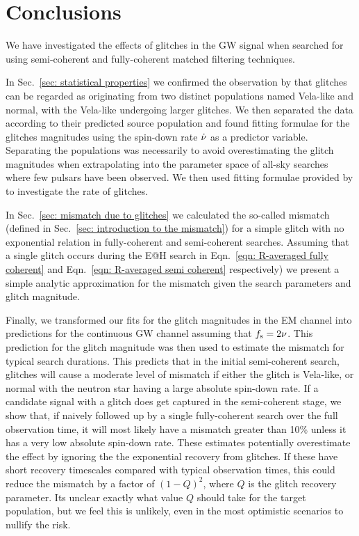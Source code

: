 \documentclass[../full_thesis/full_thesis.tex]{subfiles}
\begin{document}
\section{Conclusions}
\label{sec: conclusion}

We have investigated the effects of glitches in the GW signal when searched for
using semi-coherent and fully-coherent matched filtering techniques.

In Sec.~\ref{sec: statistical properties} we confirmed the observation by
\citet{Espinoza2011} that glitches can be regarded as originating from two
distinct populations named Vela-like and normal, with the Vela-like undergoing
larger glitches. We then separated the data according to their predicted source
population and found fitting formulae for the glitches magnitudes using the
spin-down rate $\dot{\nu}$ as a predictor variable. Separating the populations
was necessarily to avoid overestimating the glitch magnitudes when
extrapolating into the parameter space of all-sky searches where few pulsars
have been observed. We then used fitting formulae provided by
\citet{Espinoza2011} to investigate the rate of glitches.

In Sec.~\ref{sec: mismatch due to glitches} we calculated the so-called
mismatch (defined in Sec.~\ref{sec: introduction to the mismatch}) for a simple
glitch with no exponential relation in fully-coherent and semi-coherent
searches. Assuming that a single glitch occurs during the E@H search
in Eqn.~\eqref{eqn: R-averaged fully coherent} and Eqn.~\eqref{eqn:
R-averaged semi coherent} respectively) we present a simple analytic approximation
for the mismatch given the search parameters and glitch magnitude.

Finally, we transformed our fits for the glitch magnitudes in the EM channel
into predictions for the continuous GW channel assuming that $f_{\textrm{s}}=2\nu$. This
prediction for the glitch magnitude was then used to estimate the mismatch for
typical search durations. This predicts that in the initial semi-coherent
search, glitches will cause a moderate level of mismatch if either the glitch
is Vela-like, or normal with the neutron star having a large absolute spin-down
rate. If a candidate signal with a glitch does get captured in the
semi-coherent stage, we show that, if naively followed up by a single
fully-coherent search over the full observation time, it will most likely have
a mismatch greater than 10\% unless it has a very low absolute spin-down rate.
These estimates potentially overestimate the effect by ignoring the the
exponential recovery from glitches. If these have short recovery timescales
compared with typical observation times, this could reduce the mismatch by a
factor of $(1-Q)^{2}$, where $Q$ is the glitch recovery parameter. Its unclear
exactly what value $Q$ should take for the target population, but we feel this
is unlikely, even in the most optimistic scenarios to nullify the risk.
\end{document}

